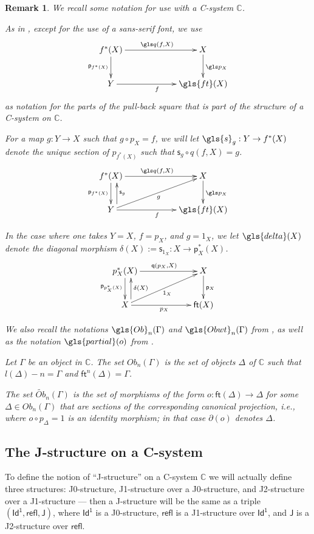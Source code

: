 \documentclass[12pt]{article}
\numberwithin{equation}{section}
\newtheorem{remark}[proposition]{Remark}
\newcommand{\sr}{\rightarrow}
\newcommand{\wt}{\widetilde}
\newcommand{\aCC}{{\mathbb C}}  %
\newcommand{\id}{1}            %
\newcommand{\ft}{\mathsf{ft}}
\newcommand{\p}{\mathsf{p}}
\newcommand{\q}{\mathsf{q}}
\newcommand{\s}{\mathsf{s}}     %
\newcommand{\Id}{\mathsf{Id^1}} %
\newcommand{\refl}{\mathsf{refl}}
\newcommand{\J}{\mathsf{J}}
\newcommand{\Ob}{Ob}
\newcommand{\Obwt}{\wt{Ob}}
\begin{document}
\begin{remark}
  We recall some notation for use with a C-system $\aCC$.

  As in \cite{Csubsystems}, except for the use of a sans-serif font, we use
  $$
    \xymatrix@C=5pc{
      f^*(X) \ar[r]^{\gls q(f,X)} \ar[d]_{\p_{f^*(X)}}  & X \ar[d]^{\gls p_X} \\
      Y \ar[r]_f & \gls{ft}(X)
    }
  $$
  as notation for the parts of the pull-back square that is part of the
  structure of a C-system on $\aCC$.

  For a map $g : Y \sr X$ such that $g \circ p_X = f$, we will let
  $\gls{s}_g : Y \sr f^*(X)$ denote the unique section of
  $p_{f^*(X)}$ such that $\s_g \circ q(f,X) = g$.
  $$
    \xymatrix@C=5pc{
      f^*(X) \ar[r]^{\gls q(f,X)} \ar[d]_{\p_{f^*(X)}} & X \ar[d]^{\gls p_X} \\
      Y \ar[ru]_g \ar[r]_f \ar@<-7pt>[u]_{\s_g} & \gls{ft}(X)
    }
  $$

  In the case where one takes $Y=X$, $f=p_X$, and $g = 1_X$, we let $\gls{delta}(X)$ denote
  the diagonal morphism $\delta(X) := \s_{\id_X} : X\sr \p_X^*(X)$.
  $$
    \xymatrix@C=5pc{
      p_X^*(X) \ar[r]^{\q(p_X,X)} \ar[d]_{\p_{p_X^*(X)}} & X \ar[d]^{\p_X} \\
      X \ar[ru]_{1_X} \ar[r]_{p_X} \ar@<-7pt>[u]_{\delta(X)} & \ft(X)
    }
  $$

  We also recall the notations ${\gls{Ob}}_n(\Gamma)$ and
  $\gls{Obwt}_n(\Gamma)$ from \cite[\S 3]{fromunivwithPiI}, as well as the
  notation $\gls{partial}(o)$ from \cite[\S 3]{Csubsystems}.

  Let $\Gamma$ be an object in $\aCC$.  The set $\Ob_n(\Gamma)$ is the set of
  objects $\Delta$ of $\aCC$ such that $l(\Delta)-n = \Gamma$ and
  $\ft^n(\Delta) = \Gamma$.

  The set $\Obwt_n(\Gamma)$ is the set of morphisms of the form $o :
  \ft(\Delta) \sr \Delta$ for some $\Delta \in \Ob_n(\Gamma)$ that are sections
  of the corresponding canonical projection, i.e., where $o \circ p_\Delta = \id$
  is an identity morphism; in that case $\partial(o)$ denotes $\Delta$.
\end{remark}

\subsection{The J-structure on a C-system}
%


To define the notion of ``J-structure'' on a C-system $\aCC$ we will actually define three
structures: J0-structure, J1-structure over a J0-structure, and J2-structure
over a J1-structure --- then a J-structure will be the same as a triple
$(\Id,\refl,\J)$, where $\Id$ is a J0-structure, $\refl$ is a J1-structure over
$\Id$, and $\J$ is a J2-structure over $\refl$.
\end{document}
